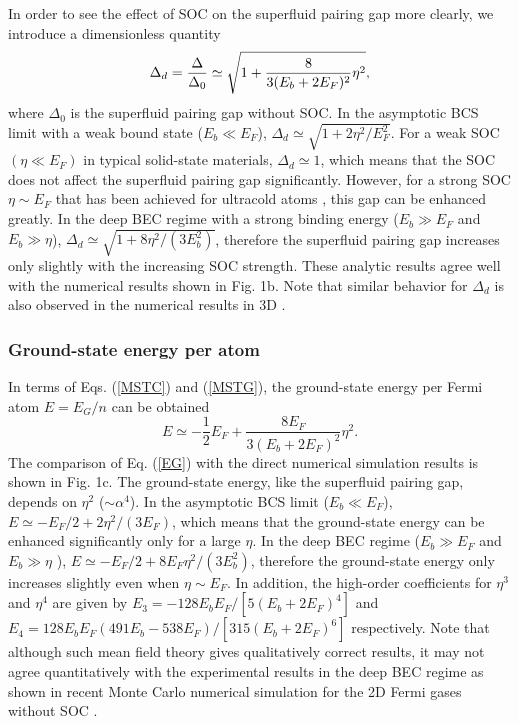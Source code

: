 \documentclass[pra,print,showpacs,superscriptaddress,twocolumn]{revtex4}
\begin{document}
In order to see the effect of SOC on the superfluid pairing gap more
clearly, we introduce a dimensionless quantity
\begin{equation}
\Delta _{d}=\frac{\Delta }{\Delta _{0}}\simeq \sqrt{1+\frac{8}{%
3(E_{b}+2E_{F})^{2}}\eta ^{2}},  \label{GN}
\end{equation}%
where $\Delta _{0}$ is the superfluid pairing gap without SOC. In the
asymptotic BCS limit with a weak bound state ($E_{b}\ll E_{F}$), $\Delta
_{d}\simeq \sqrt{1+2\eta ^{2}/E_{F}^{2}{}}$. For a weak SOC $(\eta \ll
E_{F}) $ in typical solid-state materials, $\Delta _{d}\simeq 1$, which
means that the SOC does not affect the superfluid pairing gap significantly.
However, for a strong SOC $\eta \sim E_{F}$ that has been achieved for
ultracold atoms \cite{LYJ1}, this gap can be enhanced greatly. In the deep
BEC regime with a strong binding energy ($E_{b}\gg E_{F}$ and $E_{b}\gg \eta
$), $\Delta _{d}\simeq \sqrt{1+8\eta ^{2}/(3E_{b}^{2}{})}$, therefore the
superfluid pairing gap increases only slightly with the increasing SOC
strength. These analytic results agree well with the numerical results shown
in Fig. 1b. Note that similar behavior for $\Delta _{d}$ is also observed in
the numerical results in 3D \cite{3DF}.

\subsubsection{Ground-state energy per atom}

In terms of Eqs. (\ref{MSTC}) and (\ref{MSTG}), the ground-state energy per
Fermi atom $E=E_{G}/n$ can be obtained
\begin{equation}
E\simeq -\frac{1}{2}E_{F}+\frac{8E_{F}}{3(E_{b}+2E_{F})^{2}}\eta ^{2}.
\label{EG}
\end{equation}%
The comparison of Eq. (\ref{EG}) with the direct numerical simulation
results is shown in Fig. 1c. The ground-state energy, like the superfluid
pairing gap, depends on $\eta ^{2}$ ($\sim \alpha ^{4}$). In the asymptotic
BCS limit ($E_{b}\ll E_{F}$), $E\simeq -E_{F}/2+2\eta ^{2}/(3E_{F})$, which
means that the ground-state energy can be enhanced significantly only for a
large $\eta $. In the deep BEC regime ($E_{b}\gg E_{F}$ and $E_{b}\gg \eta $%
), $E\simeq -E_{F}/2+8E_{F}\eta ^{2}/(3E_{b}^{2})$, therefore the
ground-state energy only increases slightly even when $\eta \sim E_{F}$. In
addition, the high-order coefficients for $\eta ^{3}$ and $\eta ^{4}$ are
given by $E_{3}=-128E_{b}E_{F}/[5(E_{b}+2E_{F})^{4}]$ and $%
E_{4}=128E_{b}E_{F}(491E_{b}-538E_{F})/[315(E_{b}+2E_{F})^{6}]$
respectively. Note that although such mean field theory gives
qualitatively correct results, it may not agree quantitatively with
the experimental results in the deep BEC regime as shown in recent
Monte Carlo numerical simulation for the 2D Fermi gases without SOC
\cite{Bertaina}.
\end{document}
